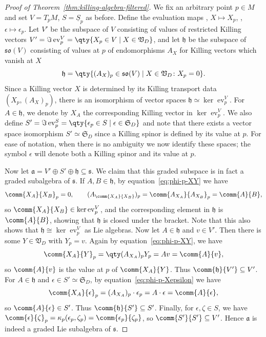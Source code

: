 \documentclass[10pt,a4paper]{amsart}
\numberwithin{equation}{section}
\newcommand{\fa}{\mathfrak{a}}
\newcommand{\fh}{\mathfrak{h}}
\newcommand{\fs}{\mathfrak{s}}
\newcommand{\fso}{\mathfrak{so}}
\newcommand{\fS}{\mathfrak{S}}
\newcommand{\fV}{\mathfrak{V}}
\newcommand{\Sbundle}{\underline{S}}
\newcommand{\1}{\mathbbm{1}}
\DeclareMathOperator{\evaluate}{ev}
\begin{document}
\begin{proof}[Proof of Theorem~\ref{thm:killing-algebra-filtered}]	
	We fix an arbitrary point $p\in M$ and set $V=T_pM$, $S=\Sbundle_p$ as before. Define the evaluation maps
\smash{$\evaluate^V_p\colon \fV_D \to V$}, $X\mapsto X_p$,
\smash{$\evaluate^S_p\colon \fS_D \to S$}, $\epsilon\mapsto \epsilon_p$.
	Let $V'$ be the subspace of $V$ consisting of values of restricted Killing vectors
$V' = \Im\evaluate^V_p = \qty{X_p\in V \mid X\in\fV_D }$,
	and let $\fh$ be the subspace of $\fso(V)$ consisting of values at $p$ of endomorphisms $A_X$ for Killing vectors which vanish at $X$
	\[
		\fh = \qty{(A_X)_p\in\fso(V) \mid X\in\fV_D\colon X_p=0}.
	\]
	Since a Killing vector $X$ is determined by its Killing transport data $(X_p,(A_X)_p)$, there is an isomorphism of vector spaces $\fh\simeq \ker\evaluate^V_p$. For $A\in\fh$, we denote by $X_A$ the corresponding Killing vector in $\ker\evaluate^V_p$. We also define
$S' = \Im\evaluate^S_p = \qty{\epsilon_p\in S \mid \epsilon\in\fS_D}
$
	and note that there exists a vector space isomorphism $S'\simeq \fS_D$ since a Killing spinor is defined by its value at $p$. For ease of notation, when there is no ambiguity we now identify these spaces; the symbol $\epsilon$ will denote both a Killing spinor and its value at $p$.
	
	Now let $\fa = V'\oplus S'\oplus\fh \subseteq \fs$. We claim that this graded subspace is in fact a graded subalgebra of $\fs$. If $A,B\in\fh$, by equation~\eqref{eq:phi-p-XY} we have
	\begin{gather*}
		\comm{X_A}{X_B}_p = 0,\qquad
		(A_{\comm{X_A}{X_B}})_p = \comm{A_{X_A}}{A_{X_B}}_p = \comm{A}{B},
	\end{gather*}
	so $\comm{X_A}{X_B}\in\ker\evaluate^V_p$, and the corresponding element in $\fh$ is $\comm{A}{B}$, showing that $\fh$ is closed under the bracket. Note that this also shows that $\fh\cong\ker\evaluate^V_p$ as Lie algebras. Now let $A\in\fh$ and $v\in V'$. Then there is some $Y\in\fV_D$ with $Y_p=v$. Again by equation~\eqref{eq:phi-p-XY}, we have
	\[
		\comm{X_A}{Y}_p = \qty(A_{X_A})_p Y_p = A v = \comm{A}{v},
	\]
	so $\comm{A}{v}$ is the value at $p$ of $\comm{X_A}{Y}$. Thus $\comm{\fh}{V'}\subseteq V'$. For $A\in\fh$ and $\epsilon\in S'\simeq\fS_D$, by equation~\eqref{eq:phi-p-Xepsilon} we have
	\[
		\comm{X_A}{\epsilon}_p = (A_{X_A})_p\cdot\epsilon_p = A\cdot\epsilon = \comm{A}{\epsilon},
	\]
	so $\comm{A}{\epsilon}\in S'$. Thus $\comm{\fh}{S'}\subseteq S'$. Finally, for $\epsilon,\zeta\in S$, we have
$\comm{\epsilon}{\zeta}_p
			= \kappa_p(\epsilon_p,\zeta_p)
			= \comm{\epsilon_p}{\zeta_p}$,
	so $\comm{S'}{S'}\subseteq V'$. Hence $\fa$ is indeed a graded Lie subalgebra of $\fs$.
	

\end{proof}
\end{document}
